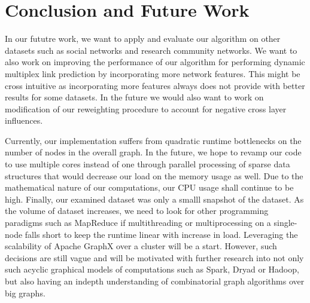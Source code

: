 \section{Conclusion and Future Work}
\label{sec:conclusion}

In our fututre work, we want to apply and evaluate our algorithm on other
datasets such as social networks and research community networks. We want to
also work on improving the performance of our algorithm for performing dynamic
multiplex link prediction by incorporating more network features. This might
be cross intuitive as incorporating more features always does not provide with
better results for some datasets.  In the future we would also want to work on
modification of our reweighting procedure to account for negative cross layer
influences.

Currently, our implementation suffers from quadratic runtime bottlenecks on
the number of nodes in the overall graph. In the future, we hope to revamp our
code to use multiple cores instead of one through parallel processing of
sparse data structures that would decrease our load on the memory usage as
well. Due to the mathematical nature of our computations, our CPU usage shall
continue to be high.  Finally, our examined dataset was only a smalll snapshot
of the dataset. As the volume of dataset increases, we need to look for other
programming paradigms such as MapReduce if multithreading or multiprocessing
on a single-node falls short to keep the runtime linear with increase in load.
Leveraging the scalability of Apache GraphX over a cluster will be a start.
However, such decisions are still vague and will be motivated with further
research into not only such acyclic graphical models of computations such as
Spark, Dryad or Hadoop, but also having an indepth understanding of
combinatorial graph algorithms over big graphs.
